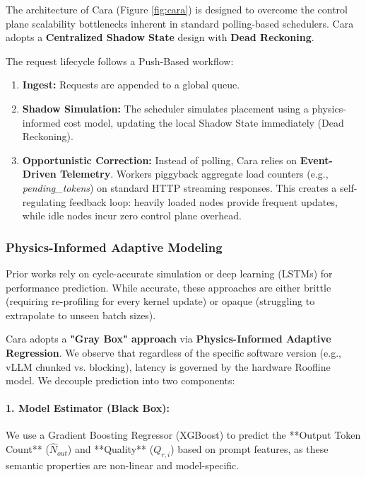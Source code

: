 \documentclass[letterpaper, anonymous, twocolumn, 10pt]{article}
\begin{document}
The architecture of Cara (Figure \ref{fig:cara}) is designed to overcome the control plane scalability bottlenecks inherent in standard polling-based schedulers. Cara adopts a \textbf{Centralized Shadow State} design with \textbf{Dead Reckoning}.

The request lifecycle follows a Push-Based workflow:
\begin{enumerate}
    \item \textbf{Ingest:} Requests are appended to a global queue.
    \item \textbf{Shadow Simulation:} The scheduler simulates placement using a physics-informed cost model, updating the local Shadow State immediately (Dead Reckoning).
    \item \textbf{Opportunistic Correction:} Instead of polling, Cara relies on \textbf{Event-Driven Telemetry}. Workers piggyback aggregate load counters (e.g., \textit{pending\_tokens}) on standard HTTP streaming responses. This creates a self-regulating feedback loop: heavily loaded nodes provide frequent updates, while idle nodes incur zero control plane overhead.
\end{enumerate}

\subsubsection{Physics-Informed Adaptive Modeling} \label{sec:modeling}
Prior works \cite{SamuLLM, da2025blockbalancingloadllm} rely on cycle-accurate simulation or deep learning (LSTMs) for performance prediction. While accurate, these approaches are either brittle (requiring re-profiling for every kernel update) or opaque (struggling to extrapolate to unseen batch sizes).

Cara adopts a \textbf{"Gray Box" approach} via \textbf{Physics-Informed Adaptive Regression}. We observe that regardless of the specific software version (e.g., vLLM chunked vs. blocking), latency is governed by the hardware Roofline model. We decouple prediction into two components:

\paragraph{1. Model Estimator (Black Box):}
We use a Gradient Boosting Regressor (XGBoost) to predict the **Output Token Count** ($\hat{N}_{out}$) and **Quality** ($Q_{r,i}$) based on prompt features, as these semantic properties are non-linear and model-specific.
\end{document}
